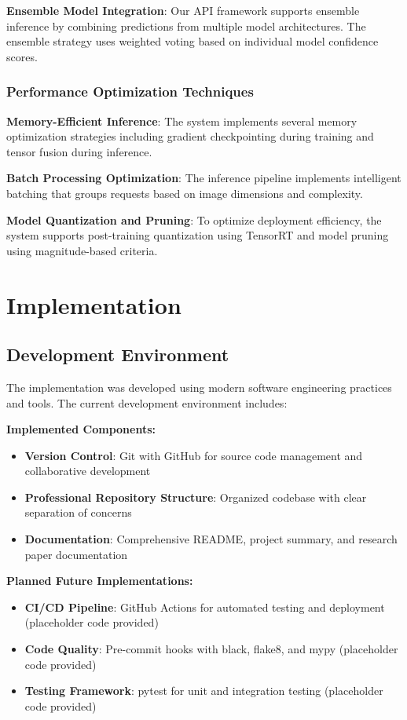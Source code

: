 \documentclass[12pt,a4paper]{article}
\begin{document}
\textbf{Ensemble Model Integration}: Our API framework supports ensemble inference by combining predictions from multiple model architectures. The ensemble strategy uses weighted voting based on individual model confidence scores.

\subsubsection{Performance Optimization Techniques}

\textbf{Memory-Efficient Inference}: The system implements several memory optimization strategies including gradient checkpointing during training and tensor fusion during inference.

\textbf{Batch Processing Optimization}: The inference pipeline implements intelligent batching that groups requests based on image dimensions and complexity.

\textbf{Model Quantization and Pruning}: To optimize deployment efficiency, the system supports post-training quantization using TensorRT and model pruning using magnitude-based criteria.

\section{Implementation}

\subsection{Development Environment}

The implementation was developed using modern software engineering practices and tools. The current development environment includes:

\textbf{Implemented Components:}
\begin{itemize}
    \item \textbf{Version Control}: Git with GitHub for source code management and collaborative development
    \item \textbf{Professional Repository Structure}: Organized codebase with clear separation of concerns
    \item \textbf{Documentation}: Comprehensive README, project summary, and research paper documentation
\end{itemize}

\textbf{Planned Future Implementations:}
\begin{itemize}
    \item \textbf{CI/CD Pipeline}: GitHub Actions for automated testing and deployment (placeholder code provided)
    \item \textbf{Code Quality}: Pre-commit hooks with black, flake8, and mypy (placeholder code provided)
    \item \textbf{Testing Framework}: pytest for unit and integration testing (placeholder code provided)
\end{itemize}
\end{document}
